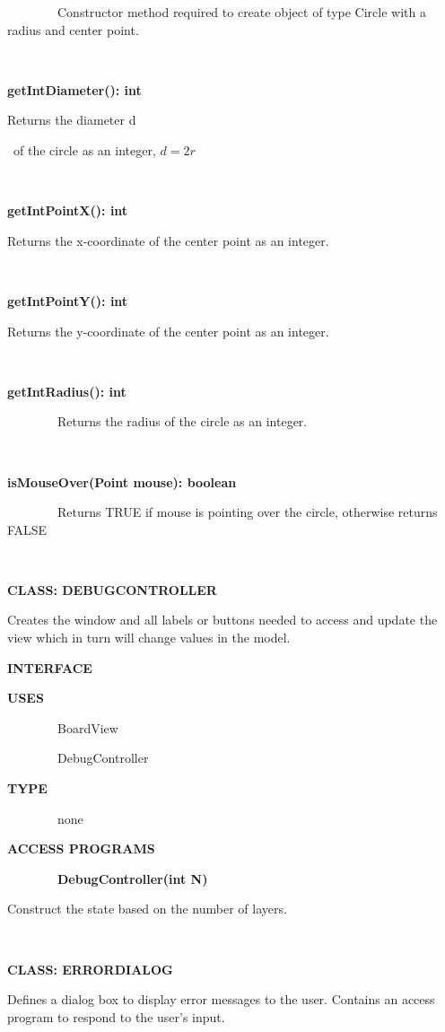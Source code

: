 \documentclass{article}
\begin{document}
{~~~~~~~~Constructor method required to create object of type Circle with a radius and center point.}

{~~~~~~~~~~~~~~~~}

{\textbf{getIntDiameter(): int}}

{Returns the diameter }{d}{~of the circle as an integer, \(d=2r\)

{~~~~~~~~~~~~~~~~}

{\textbf{getIntPointX(): int}}

{Returns the x-coordinate of the center point as an integer.}

{~~~~~~~~~~~~~~~~}

{\textbf{getIntPointY(): int}}

{Returns the y-coordinate of the center point as an integer.}

{~~~~~~~~~~~~~~~~}

{\textbf{getIntRadius(): int}}

{~~~~~~~~Returns the radius of the circle as an integer.}

{~~~~~~~~~~~~~~~~}

{\textbf{isMouseOver(Point mouse): boolean}}

{~~~~~~~~Returns }{TRUE }{if mouse is pointing over the circle,
otherwise returns FALSE}

{~~~~~~~~~~~~~~~~}

{}

{\textbf{CLASS: DEBUGCONTROLLER}}

{Creates the window and all labels or buttons needed to access and
update the view which in turn will change values in the model.}

{}

{\textbf{INTERFACE}}

{}

{\textbf{USES}}

{~~~~~~~~BoardView}

{~~~~~~~~DebugController}

{\textbf{TYPE}}

{~~~~~~~~none}

{\textbf{ACCESS PROGRAMS}}

{~~~~~~~~\textbf{DebugController(int N)}}

{Construct the state based on the number of layers.}

{~~~~~~~~}

{}

{\textbf{CLASS: ERRORDIALOG}}

{Defines a dialog box to display error messages to the user. Contains an
access program to respond to the user's input.}

}
\end{document}

